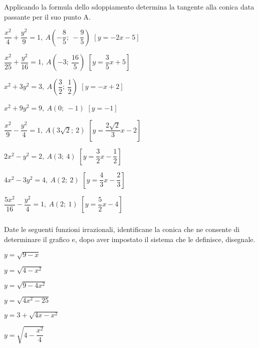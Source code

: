 \begin{esercizio}
  \label{ese:div.003}
  Applicando la formula dello sdoppiamento determina la tangente alla 
conica data passante per il suo punto A.
  \begin{enumeratea}
\item $\dfrac{x^{2}}{4}+\dfrac{y^{2}}{9}=1,~A\left(-\dfrac{8}{5};~- 
\dfrac{9}{5}\right)$  
\hfill $\left[y=-2x-5\right]$
\item $\dfrac{x^{2}}{25}+\dfrac{y^{2}}{16}=1,~A\left(-3;~\dfrac{16}{5} 
\right)$
\hfill $\left[y=\dfrac{3}{5}x+5\right]$
\item $x^{2}+3y^{2}=3,~A\left(\dfrac{3}{2};~\dfrac{1}{2} \right)$
\hfill $\left[y=-x+2\right]$
\item $x^{2}+9y^{2}=9,~A(0;~-1)$
\hfill $\left[y=-1\right]$
\item $\dfrac{x^{2}}{9}-\dfrac{y^{2}}{4}=1,~A\left(3\sqrt{2};~2\right)$
\hfill $\left[y=\dfrac{2\sqrt{2}}{3}x-2\right]$
\item $2x^{2}-y^{2}=2,~A(3;~4)$
\hfill $\left[y=\dfrac{3}{2}x-\dfrac{1}{2}\right]$
\item $4x^{2}-3y^{2}=4,~A(2;~2)$
\hfill $\left[y=\dfrac{4}{3}x-\dfrac{2}{3}\right]$
\item $\dfrac{5x^{2}}{16}-\dfrac{y^{2}}{4}=1,~A(2;~1)$
\hfill$\left[y=\dfrac{5}{2}x-4\right]$
\end{enumeratea}
\end{esercizio}


\subsubsection*{}

\begin{esercizio}
  \label{ese:div.003}
  Date le seguenti funzioni irrazionali, identificane la conica che 
ne consente di determinare il grafico e, dopo aver impostato il sistema che 
le definisce, disegnale. 
  \begin{enumeratea}
    \item $ y=\sqrt{9-x} $
    \item $y=\sqrt{4-x^{2}}  $
    \item $ y=\sqrt{9-4x^{2}} $
    \item $ y=\sqrt{4x^{2}-25} $
    \item $ y=3+\sqrt{4x-x^{2}} $
    \item $ y=\sqrt{4-\dfrac{x^{2}}{4}} $
  \end{enumeratea}
\end{esercizio}


% 
% 
